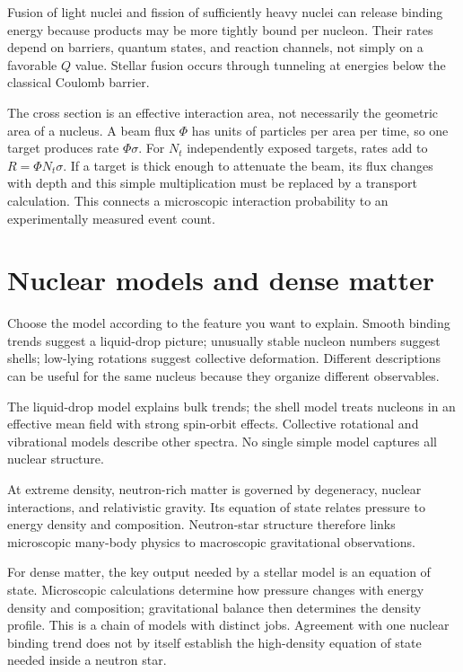 \documentclass[11pt,oneside]{book}
\theoremstyle{reviewstyle}
\begin{document}
Fusion of light nuclei and fission of sufficiently heavy nuclei can release binding energy because products may be more tightly bound per nucleon. Their rates depend on barriers, quantum states, and reaction channels, not simply on a favorable $Q$ value. Stellar fusion occurs through tunneling at energies below the classical Coulomb barrier.

The cross section is an effective interaction area, not necessarily the geometric area of a nucleus. A beam flux $\Phi$ has units of particles per area per time, so one target produces rate $\Phi\sigma$. For $N_t$ independently exposed targets, rates add to $R=\Phi N_t\sigma$. If a target is thick enough to attenuate the beam, its flux changes with depth and this simple multiplication must be replaced by a transport calculation. This connects a microscopic interaction probability to an experimentally measured event count.

\section{Nuclear models and dense matter}
Choose the model according to the feature you want to explain. Smooth binding trends suggest a liquid-drop picture; unusually stable nucleon numbers suggest shells; low-lying rotations suggest collective deformation. Different descriptions can be useful for the same nucleus because they organize different observables.

The liquid-drop model explains bulk trends; the shell model treats nucleons in an effective mean field with strong spin-orbit effects. Collective rotational and vibrational models describe other spectra. No single simple model captures all nuclear structure.

At extreme density, neutron-rich matter is governed by degeneracy, nuclear interactions, and relativistic gravity. Its equation of state relates pressure to energy density and composition. Neutron-star structure therefore links microscopic many-body physics to macroscopic gravitational observations.

For dense matter, the key output needed by a stellar model is an equation of state. Microscopic calculations determine how pressure changes with energy density and composition; gravitational balance then determines the density profile. This is a chain of models with distinct jobs. Agreement with one nuclear binding trend does not by itself establish the high-density equation of state needed inside a neutron star.
\end{document}
